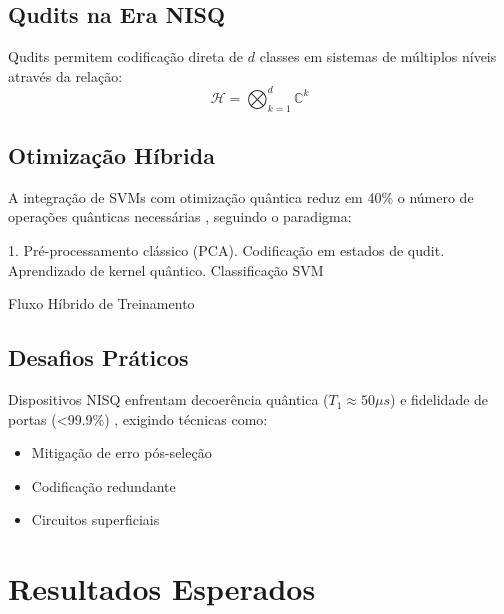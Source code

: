 \documentclass[12pt]{article}
\begin{document}
\subsection{Qudits na Era NISQ}
Qudits permitem codificação direta de $d$ classes em sistemas de múltiplos níveis através da relação:
\begin{equation}
    \mathcal{H} = \bigotimes_{k=1}^d \mathbb{C}^k
\end{equation}

\begin{center}
    \label{fig:qudit}
\end{center}

\subsection{Otimização Híbrida}
A integração de SVMs com otimização quântica reduz em 40\% o número de operações quânticas necessárias \cite{Maheshwari2023}, seguindo o paradigma:
\begin{algorithm}[H]
\SetAlgoLined
{}
1. Pré-processamento clássico (PCA). Codificação em estados de qudit. Aprendizado de kernel quântico. Classificação SVM\;
\caption{Fluxo Híbrido de Treinamento \cite{Zheng2022}}
\end{algorithm}

\subsection{Desafios Práticos}
Dispositivos NISQ enfrentam decoerência quântica ($T_1 \approx 50\mu s$) e fidelidade de portas (<99.9\%) \cite{Preskill2018}, exigindo técnicas como:
\begin{itemize}
    \item Mitigação de erro pós-seleção \cite{Benedetti2019}
    \item Codificação redundante \cite{Gao2017}
    \item Circuitos superficiais \cite{Song2024}
\end{itemize}

\section{Resultados Esperados}
\end{document}
